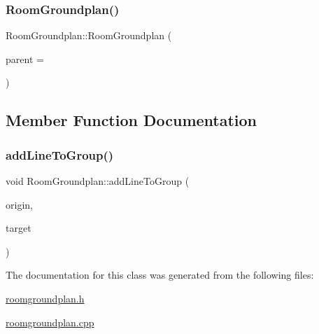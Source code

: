 \subsubsection{\texorpdfstring{Room\+Groundplan()}{RoomGroundplan()}}
{\footnotesize\ttfamily Room\+Groundplan\+::\+Room\+Groundplan (\begin{DoxyParamCaption}\item[{Q\+Graphics\+Item $\ast$}]{parent = {} }\end{DoxyParamCaption})}



\subsection{Member Function Documentation}
\mbox{\label{class_room_groundplan_a5d9a4ec1560851a77f6797c41d713ac8}} 
\subsubsection{\texorpdfstring{add\+Line\+To\+Group()}{addLineToGroup()}}
{\footnotesize\ttfamily void Room\+Groundplan\+::add\+Line\+To\+Group (\begin{DoxyParamCaption}\item[{Q\+PointF}]{origin,  }\item[{Q\+PointF}]{target }\end{DoxyParamCaption})}



The documentation for this class was generated from the following files\+:\begin{DoxyCompactItemize}
\item 
\hyperlink{roomgroundplan_8h}{roomgroundplan.\+h}\item 
\hyperlink{roomgroundplan_8cpp}{roomgroundplan.\+cpp}\end{DoxyCompactItemize}
